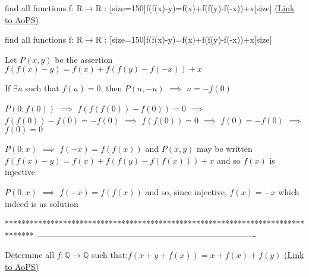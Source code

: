 \begin{problem}
	find all functions f: R$\rightarrow$R :
[size=150]f(f(x)-y)=f(x)+f(f(y)-f(-x))+x[\/size]
	\flushright \href{https://artofproblemsolving.com/community/c6h467658}{(Link to AoPS)}
\end{problem}



\begin{solution}
	\begin{tcolorbox}find all functions f: R$\rightarrow$R :
[size=150]f(f(x)-y)=f(x)+f(f(y)-f(-x))+x[\/size]\end{tcolorbox}
Let $P(x,y)$ be the assertion $f(f(x)-y)=f(x)+f(f(y)-f(-x))+x$

If $\exists u$ such that $f(u)=0$, then $P(u,-u)$ $\implies$ $u=-f(0)$

$P(0,f(0))$ $\implies$ $f(f(f(0))-f(0))=0$ $\implies$ $f(f(0))-f(0)=-f(0)$ $\implies$ $f(f(0))=0$ $\implies$ $f(0)=-f(0)$ $\implies$ $f(0)=0$

$P(0,x)$ $\implies$ $f(-x)=f(f(x))$ and $P(x,y)$ may be written $f(f(x)-y)=f(x)+f(f(y)-f(f(x)))+x$ and so $f(x)$ is injective

$P(0,x)$ $\implies$ $f(-x)=f(f(x))$ and so, since injective, $\boxed{f(x)=-x}$ which indeed is as solution
\end{solution}
*******************************************************************************
-------------------------------------------------------------------------------

\begin{problem}
	Determine all $f:\mathbb{Q}\to\mathbb{Q}$ such that:$f(x+y+f(x))=x+f(x)+f(y)$
	\flushright \href{https://artofproblemsolving.com/community/c6h467880}{(Link to AoPS)}
\end{problem}



